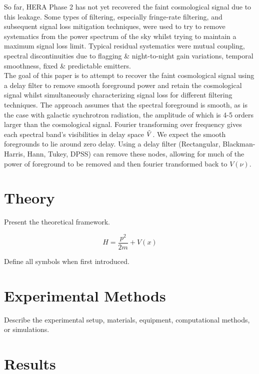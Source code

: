 \documentclass[11pt,a4paper]{article}
\begin{document}
So far, HERA Phase 2 has not yet recovered the faint cosmological signal due to this leakage. Some types of filtering, especially fringe-rate filtering, and subsequent signal loss mitigation techniques, were used to try to remove systematics from the power spectrum of the sky whilst trying to maintain a maximum signal loss limit. Typical residual systematics were mutual coupling, spectral discontinuities due to flagging \& night-to-night gain variations, temporal smoothness, fixed \& predictable emitters.  \\

The goal of this paper is to attempt to recover the faint cosmological signal using a delay filter to remove smooth foreground power and retain the cosmological signal whilst simultaneously characterizing signal loss for different filtering techniques. The approach assumes that the spectral foreground is smooth, as is the case with galactic synchrotron radiation, the amplitude of which is 4-5 orders larger than the cosmological signal. Fourier transforming over frequency gives each spectral band's visibilities in delay space \(\Tilde{V}\). We expect the smooth foregrounds to lie around zero delay. Using a delay filter (Rectangular, Blackman-Harris, Hann, Tukey, DPSS) can remove these nodes, allowing for much of the power of foreground to be removed and then fourier transformed back to \(V(\nu)\).

\section{Theory}

Present the theoretical framework.

\begin{equation}
    H = \frac{p^2}{2m} + V(x)
\end{equation}

Define all symbols when first introduced.

\section{Experimental Methods}

Describe the experimental setup, materials,
equipment, computational methods, or simulations.

\section{Results}
\end{document}
